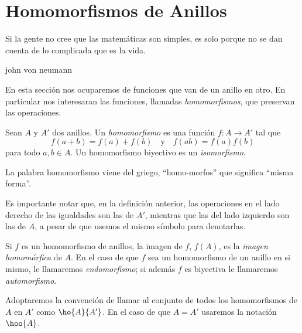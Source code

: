 %
\section{Homomorfismos de Anillos}
\epigraph{Si la gente no cree que las matemáticas son simples, es solo porque no se dan cuenta de lo complicada que es la vida.}{john von neumann}
{\noindent En esta sección  nos ocuparemos de funciones que van de un anillo en otro. En particular nos interesaran las funciones, llamadas \textit{homomorfismos}, que preservan las operaciones. }
\begin{defi}[homomorfismo] \label{defhomo} 
	Sean $A$ y $A'$ dos anillos. Un \textit{homomorfismo} es una función $f\colon A\to A'$ tal que
	\[ f(a+b) = f(a) + f(b) \quad \text{y} \quad f(ab) = f(a)f(b) \]
	para todo $a,b\in A$. Un homomorfismo biyectivo es un \textit{isomorfismo}.
\end{defi} 
\begin{nota}
	La palabra homomorfismo viene del griego, ``homo-morfos''  que significa ``misma forma''.
\end{nota}
Es importante notar que, en la definición anterior, las operaciones en el lado derecho de las igualdades son las de $A'$, mientras que las del lado izquierdo son las de $A$, a pesar de que usemos el mismo símbolo para denotarlas.

Si $f$ es un homomorfismo de anillos, la imagen de $f$, $f(A)$, es la \textit{imagen homomórfica} de $A$. En el caso de que $f$ sea un homomorfismo de un anillo en si mismo, le llamaremos \textit{endomorfismo}; si además $f$ es biyectiva le llamaremos \textit{automorfismo}.

Adoptaremos la convención de llamar al conjunto de todos los homomorfismos de $A$ en $A'$ como $\ho{A}{A'}$. En el caso de que $A=A'$ usaremos la notación $\hoo{A}$.

